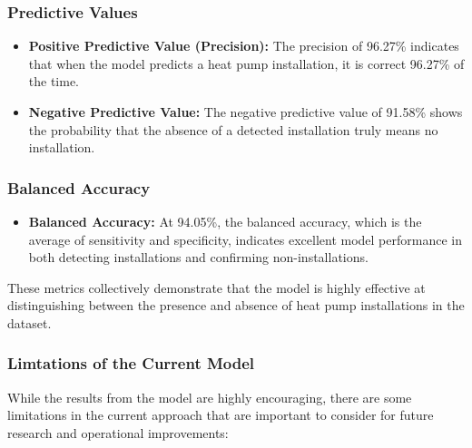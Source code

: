 \documentclass[
]{article}
\providecommand{\tightlist}{%
  \setlength{\itemsep}{0pt}\setlength{\parskip}{0pt}}
\begin{document}
\subsubsection{Predictive Values}\label{predictive-values}

\begin{itemize}
\tightlist
\item
  \textbf{Positive Predictive Value (Precision):} The precision of 96.27\% indicates that when the model predicts a heat pump installation, it is correct 96.27\% of the time.
\item
  \textbf{Negative Predictive Value:} The negative predictive value of 91.58\% shows the probability that the absence of a detected installation truly means no installation.
\end{itemize}

\subsubsection{Balanced Accuracy}\label{balanced-accuracy}

\begin{itemize}
\tightlist
\item
  \textbf{Balanced Accuracy:} At 94.05\%, the balanced accuracy, which is the average of sensitivity and specificity, indicates excellent model performance in both detecting installations and confirming non-installations.
\end{itemize}

These metrics collectively demonstrate that the model is highly effective at distinguishing between the presence and absence of heat pump installations in the dataset.

\subsubsection{Limtations of the Current Model}\label{limtations-of-the-current-model}

While the results from the model are highly encouraging, there are some limitations in the current approach that are important to consider for future research and operational improvements:
\end{document}
